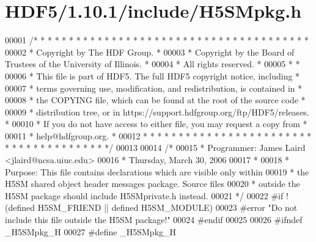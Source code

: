 \hypertarget{_h_d_f5_21_810_81_2include_2_h5_s_mpkg_8h_source}{}\section{H\+D\+F5/1.10.1/include/\+H5\+S\+Mpkg.h}
\label{_h_d_f5_21_810_81_2include_2_h5_s_mpkg_8h_source}

\begin{DoxyCode}
00001 \textcolor{comment}{/* * * * * * * * * * * * * * * * * * * * * * * * * * * * * * * * * * * * * * *}
00002 \textcolor{comment}{ * Copyright by The HDF Group.                                               *}
00003 \textcolor{comment}{ * Copyright by the Board of Trustees of the University of Illinois.         *}
00004 \textcolor{comment}{ * All rights reserved.                                                      *}
00005 \textcolor{comment}{ *                                                                           *}
00006 \textcolor{comment}{ * This file is part of HDF5.  The full HDF5 copyright notice, including     *}
00007 \textcolor{comment}{ * terms governing use, modification, and redistribution, is contained in    *}
00008 \textcolor{comment}{ * the COPYING file, which can be found at the root of the source code       *}
00009 \textcolor{comment}{ * distribution tree, or in https://support.hdfgroup.org/ftp/HDF5/releases.  *}
00010 \textcolor{comment}{ * If you do not have access to either file, you may request a copy from     *}
00011 \textcolor{comment}{ * help@hdfgroup.org.                                                        *}
00012 \textcolor{comment}{ * * * * * * * * * * * * * * * * * * * * * * * * * * * * * * * * * * * * * * */}
00013 
00014 \textcolor{comment}{/*}
00015 \textcolor{comment}{ * Programmer:  James Laird <jlaird@ncsa.uiuc.edu>}
00016 \textcolor{comment}{ *              Thursday, March 30, 2006}
00017 \textcolor{comment}{ *}
00018 \textcolor{comment}{ * Purpose:     This file contains declarations which are visible only within}
00019 \textcolor{comment}{ *              the H5SM shared object header messages package.  Source files}
00020 \textcolor{comment}{ *              outside the H5SM package should include H5SMprivate.h instead.}
00021 \textcolor{comment}{ */}
00022 \textcolor{preprocessor}{#if !(defined H5SM\_FRIEND || defined H5SM\_MODULE)}
00023 \textcolor{preprocessor}{#error "Do not include this file outside the H5SM package!"}
00024 \textcolor{preprocessor}{#endif}
00025 
00026 \textcolor{preprocessor}{#ifndef \_H5SMpkg\_H}
00027 \textcolor{preprocessor}{#define \_H5SMpkg\_H}

\end{DoxyCode}
